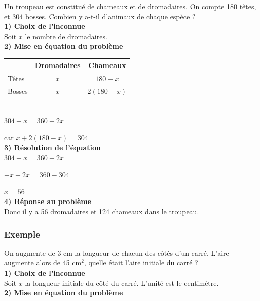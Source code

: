 Un troupeau est constitué de chameaux et de dromadaires. On compte 180 têtes, et 304 bosses. Combien y a-t-il d'animaux de chaque espèce ? \\

\textbf{1) Choix de l'inconnue } \\

Soit $x$ le nombre de dromadaires. \\

\textbf{2) Mise en équation du problème} \\

\begin{tabular}{l|c|c|}
& Dromadaires & Chameaux \\
\hline
Têtes & $x$ & $180-x$ \\
\hline
Bosses & $x$ & $2\left(180-x\right)$ \\ 
\hline
\end{tabular}  \\

$304-x = 360 - 2x $

car $x+2\left(180-x\right)=304$ \\

\textbf{3) Résolution de l'équation} \\

$304-x = 360 - 2x$

$-x+2x = 360-304 $

$x = 56 $ \\

\textbf{4) Réponse au problème} \\

Donc il y a 56 dromadaires et 124 chameaux dans le troupeau.

\newpage

\subsubsection{Exemple }

On augmente de 3 cm la longueur de chacun des côtés d'un carré. L'aire augmente alors de 45  cm$^2 $, quelle était l'aire initiale du carré ? \\



\textbf{1) Choix de l'inconnue} \\

Soit $x$ la longueur initiale du côté du carré. L'unité est le centimètre. \\

\textbf{2) Mise en équation du problème} \\

